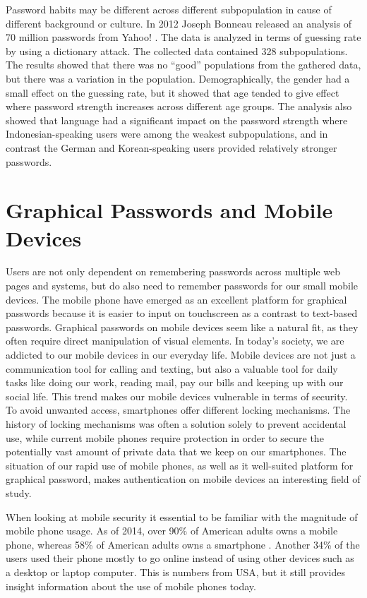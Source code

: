   Password habits may be different across different subpopulation in cause of different background or culture. In 2012 Joseph Bonneau released an analysis of 70 million passwords from Yahoo! \cite{Bonneau2}. The data is analyzed in terms of guessing rate by using a dictionary attack. The collected data contained 328 subpopulations. The results showed that there was no ``good'' populations from the gathered data, but there was a variation in the population. Demographically, the gender had a small effect on the guessing rate, but it showed that age tended to give effect where password strength increases across different age groups. The analysis also showed that language had a significant impact on the password strength where Indonesian-speaking users were among the weakest subpopulations, and in contrast the German and Korean-speaking users provided relatively stronger passwords.

  \section{Graphical Passwords and Mobile Devices} \label{sec:mobiledevice}
  Users are not only dependent on remembering passwords across multiple web pages and systems, but do also need to remember passwords for our small mobile devices. The mobile phone have emerged as an excellent platform for graphical passwords because it is easier to input on touchscreen as a contrast to text-based passwords. Graphical passwords on mobile devices seem like a natural fit, as they often require direct manipulation of visual elements. In today's society, we are addicted to our mobile devices in our everyday life. Mobile devices are not just a communication tool for calling and texting, but also a valuable tool for daily tasks like doing our work, reading mail, pay our bills and keeping up with our social life. This trend makes our mobile devices vulnerable in terms of security. To avoid unwanted access, smartphones offer different locking mechanisms. The history of locking mechanisms was often a solution solely to prevent accidental use, while current mobile phones require protection in order to secure the potentially vast amount of private data that we keep on our smartphones. The situation of our rapid use of mobile phones, as well as it well-suited platform for graphical password, makes authentication on mobile devices an interesting field of study.

  When looking at mobile security it essential to be familiar with the magnitude of mobile phone usage. As of 2014, over 90\% of American adults owns a mobile phone, whereas 58\% of American adults owns a smartphone \cite{MobileUseage}. Another 34\% of the users used their phone mostly to go online instead of using other devices such as a desktop or laptop computer. This is numbers from USA, but it still provides insight information about the use of mobile phones today.

